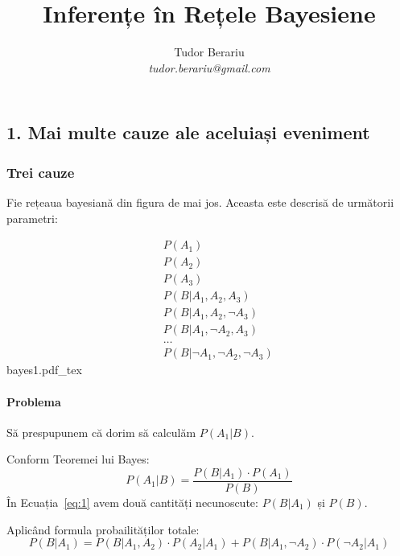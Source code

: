 \documentclass[12pt]{article}
\title{Inferențe în Rețele Bayesiene}
\author{Tudor Berariu \\ \emph{tudor.berariu@gmail.com}}
\begin{document}
\maketitle

\subsection*{1. Mai multe cauze ale aceluiași eveniment}
\label{mc}

\subsubsection*{Trei cauze}
\label{sec:trei}

Fie rețeaua bayesiană din figura de mai jos. Aceasta este
descrisă de următorii parametri:
\begin{multicols}{2}
  \begin{eqnarray*}
    & & P(A_1) \\
    & & P(A_2) \\
    & & P(A_3) \\
    & & P(B \vert A_1, A_2, A_3) \\
    & & P(B \vert A_1, A_2, \neg A_3) \\
    & & P(B \vert A_1, \neg A_2, A_3) \\
    & & \ldots \\
    & & P(B \vert \neg A_1, \neg A_2, \neg A_3)
  \end{eqnarray*}
  \vfill
  \def\svgwidth{6cm}
  {bayes1.pdf_tex}
\end{multicols}

\paragraph{Problema}

Să prespupunem că dorim să calculăm $P(A_1 \vert B)$.

Conform Teoremei lui Bayes:
\begin{equation}
  \label{eq:1}
  P(A_1 \vert B) = \dfrac{P(B \vert A_1) \cdot P(A_1)}{P(B)}
\end{equation}
În Ecuația~\ref{eq:1} avem două cantități necunoscute: $P(B \vert
A_1)$ și $P(B)$.

Aplicând formula probailităților totale:
\begin{equation}
  \label{eq:2}
  P(B \vert A_1) = P(B \vert A_1, A_2) \cdot P(A_2 \vert A_1) + P(B \vert A_1, \neg A_2) \cdot P(\neg A_2 \vert A_1)
\end{equation}
\end{document}
